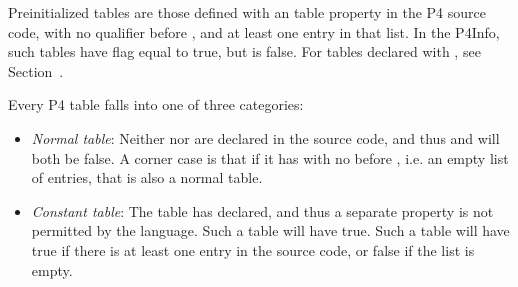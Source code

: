 \documentclass[11pt]{article}
\begin{document}
{%
\noindent{}Preinitialized tables are those defined with an  table
property in the P4 source code, with no  qualifier before
, and at least one entry in that list.  In the P4Info, such
tables have  flag equal to true, but
 is false.  For tables declared with ,
see Section~.%

Every P4 table falls into one of three categories:%

\begin{itemize}[noitemsep,topsep=\mdcompacttopsep]%

\item{}\emph{Normal table}: Neither  nor  are declared
in the source code, and thus  and
 will both be false.  A corner case is that if
it has  with no  before , i.e. an
empty list of entries, that is also a normal table.%

\item{}\emph{Constant table}: The table has  declared, and thus a
separate  property is not permitted by the language.  Such
a table will have  true.  Such a table will have
 true if there is at least one entry in the
source code, or false if the list is empty.%


\end{itemize}}
\end{document}
